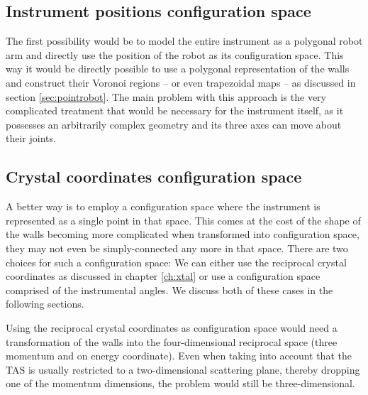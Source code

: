 \subsection{Instrument positions configuration space}
The first possibility would be to model the entire instrument as a polygonal 
robot arm and directly use the position of the robot as its configuration space. 
This way it would be directly possible to use a polygonal representation of the 
walls and construct their Voronoi regions -- or even trapezoidal maps -- as 
discussed in section \ref{sec:pointrobot}. The main problem with this approach 
is the very complicated treatment that would be necessary for the instrument 
itself, as it possesses an arbitrarily complex geometry and its three axes
can move about their joints.


\subsection{Crystal coordinates configuration space}
A better way is to employ a configuration space where the instrument is represented 
as a single point in that space. 
This comes at the cost of the shape of the walls becoming more complicated when 
transformed into configuration space, they may not even be simply-connected 
any more in that space. 
There are two choices for such a configuration space: We can either use the 
reciprocal crystal coordinates as discussed in chapter \ref{ch:xtal} or use a 
configuration space comprised of the instrumental angles.
We discuss both of these cases in the following sections.

Using the reciprocal crystal coordinates as configuration space would need a 
transformation of the walls into the four-dimensional reciprocal space 
(three momentum and on energy coordinate). Even when taking into account that 
the TAS is usually restricted to a two-dimensional scattering plane, thereby 
dropping one of the momentum dimensions, the problem would still be three-dimensional.

